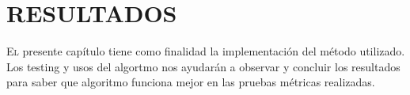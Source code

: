 \doublespacing
\chapter{RESULTADOS}

\lettrine[lines=4, slope=0.2em, findent=0.2em, nindent=0.6em]{E}{l}  presente capítulo tiene como finalidad la implementación del método utilizado. Los testing y usos del algortmo nos ayudarán a observar y concluir los resultados para saber que algoritmo funciona mejor en las pruebas métricas realizadas.   









